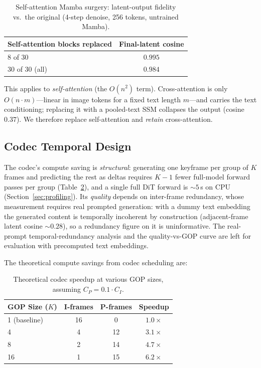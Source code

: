 \documentclass[11pt]{article}
\begin{document}
\begin{table}[h]
\centering
\caption{Self-attention Mamba surgery: latent-output fidelity vs.\ the original
(4-step denoise, 256 tokens, untrained Mamba).}
\label{tab:mamba}
\begin{tabular}{@{}lc@{}}
\toprule
Self-attention blocks replaced & Final-latent cosine \\
\midrule
8 of 30 & $0.995$ \\
30 of 30 (all) & $0.984$ \\
\bottomrule
\end{tabular}
\end{table}

This applies to \emph{self-attention} (the $O(n^2)$ term). Cross-attention is
only $O(n\cdot m)$---linear in image tokens for a fixed text length $m$---and
carries the text conditioning; replacing it with a pooled-text SSM collapses the
output (cosine $0.37$). We therefore replace self-attention and \emph{retain}
cross-attention.

\subsection{Codec Temporal Design}

The codec's compute saving is \emph{structural}: generating one keyframe per
group of $K$ frames and predicting the rest as deltas requires $K-1$ fewer
full-model forward passes per group (Table~\ref{tab:codec_theory}), and a single
full DiT forward is ${\sim}5$\,s on CPU (Section~\ref{sec:profiling}). Its
\emph{quality} depends on inter-frame redundancy, whose measurement requires
real prompted generation: with a dummy text embedding the generated content is
temporally incoherent by construction (adjacent-frame latent cosine ${\sim}0.28$),
so a redundancy figure on it is uninformative. The real-prompt temporal-redundancy
analysis and the quality-vs-GOP curve are left for evaluation with precomputed
text embeddings.

The theoretical compute savings from codec scheduling are:

\begin{table}[h]
\centering
\caption{Theoretical codec speedup at various GOP sizes, assuming $C_P = 0.1 \cdot C_I$.}
\label{tab:codec_theory}
\begin{tabular}{@{}lccc@{}}
\toprule
GOP Size ($K$) & I-frames & P-frames & Speedup \\
\midrule
1 (baseline) & 16 & 0 & $1.0\times$ \\
4 & 4 & 12 & $3.1\times$ \\
8 & 2 & 14 & $4.7\times$ \\
16 & 1 & 15 & $6.2\times$ \\
\bottomrule
\end{tabular}
\end{table}
\end{document}
